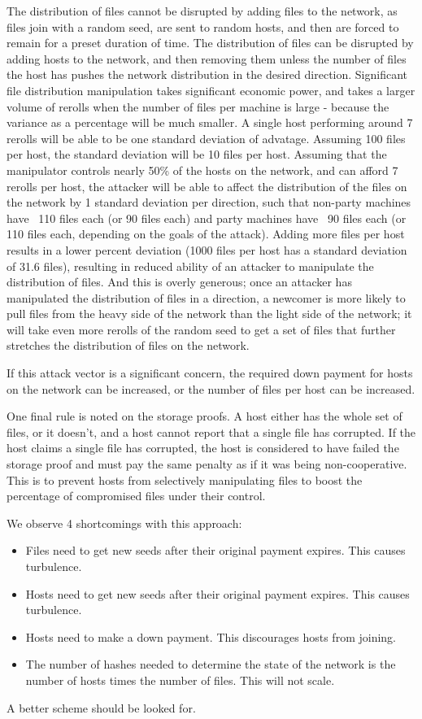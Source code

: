 \documentclass[twocolumn]{article}
\begin{document}
The distribution of files cannot be disrupted by adding files to the network, as files join with a random seed, are sent to random hosts, and then are forced to remain for a preset duration of time.
The distribution of files can be disrupted by adding hosts to the network, and then removing them unless the number of files the host has pushes the network distribution in the desired direction.
Significant file distribution manipulation takes significant economic power, and takes a larger volume of rerolls when the number of files per machine is large - because the variance as a percentage will be much smaller.
A single host performing around 7 rerolls will be able to be one standard deviation of advatage.
Assuming 100 files per host, the standard deviation will be 10 files per host.
Assuming that the manipulator controls nearly 50\% of the hosts on the network, and can afford 7 rerolls per host, the attacker will be able to affect the distribution of the files on the network by 1 standard deviation per direction, such that non-party machines have ~110 files each (or 90 files each) and party machines have ~90 files each (or 110 files each, depending on the goals of the attack).
Adding more files per host results in a lower percent deviation (1000 files per host has a standard deviation of 31.6 files), resulting in reduced ability of an attacker to manipulate the distribution of files.
And this is overly generous; once an attacker has manipulated the distribution of files in a direction, a newcomer is more likely to pull files from the heavy side of the network than the light side of the network; it will take even more rerolls of the random seed to get a set of files that further stretches the distribution of files on the network.

If this attack vector is a significant concern, the required down payment for hosts on the network can be increased, or the number of files per host can be increased.

One final rule is noted on the storage proofs.
A host either has the whole set of files, or it doesn't, and a host cannot report that a single file has corrupted.
If the host claims a single file has corrupted, the host is considered to have failed the storage proof and must pay the same penalty as if it was being non-cooperative.
This is to prevent hosts from selectively manipulating files to boost the percentage of compromised files under their control.

We observe 4 shortcomings with this approach:
\begin{itemize}
	\item Files need to get new seeds after their original payment expires. This causes turbulence.
	\item Hosts need to get new seeds after their original payment expires. This causes turbulence.
	\item Hosts need to make a down payment. This discourages hosts from joining.
	\item The number of hashes needed to determine the state of the network is the number of hosts times the number of files. This will not scale.
\end{itemize}
A better scheme should be looked for.
\end{document}
